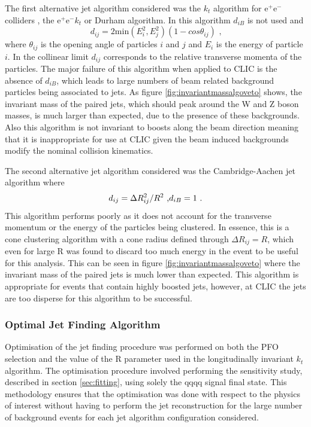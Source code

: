 The first alternative jet algorithm considered was the $k_{t}$ algorithm for $\text{e}^{+}\text{e}^{-}$ colliders \cite{Catani:1991hj}, the $\text{e}^{+}\text{e}^{-}k_{t}$  or Durham algorithm.  In this algorithm $d_{iB}$ is not used and 
%
\begin{equation}
d_{ij} = 2\text{min}(E_{i}^{2}, E_{j}^{2})(1-cos\theta_{ij}) \text{ ,}
\end{equation}
%
\noindent where $\theta_{ij}$ is the opening angle of particles $i$ and $j$ and $E_{i}$ is the energy of particle $i$.  In the collinear limit $d_{ij}$ corresponds to the relative transverse momenta of the particles.  The major failure of this algorithm when applied to CLIC is the absence of $d_{iB}$, which leads to large numbers of beam related background particles being associated to jets.  As figure \ref{fig:invariantmassalgoveto} shows, the invariant mass of the paired jets, which should peak around the W and Z boson masses, is much larger than expected, due to the presence of these backgrounds.  Also this algorithm is not invariant to boosts along the beam direction meaning that it is inappropriate for use at CLIC given the beam induced backgrounds modify the nominal collision kinematics.  

The second alternative jet algorithm considered was the Cambridge-Aachen jet algorithm \cite{Dokshitzer:1997in} where 
%
\begin{equation}
d_{ij} = {\Delta}R_{ij}^{2}/R^2 \text{ ,} \\
d_{iB} = 1 \text{ .}
\end{equation}
%
\noindent This algorithm performs poorly as it does not account for the transverse momentum or the energy of the particles being clustered. In essence, this is a cone clustering algorithm with a cone radius defined through ${\Delta}R_{ij} = R$, which even for large R was found to discard too much energy in the event to be useful for this analysis.  This can be seen in figure \ref{fig:invariantmassalgoveto} where the invariant mass of the paired jets is much lower than expected.  This algorithm is appropriate for events that contain highly boosted jets, however, at CLIC the jets are too disperse for this algorithm to be successful.


\subsubsection{Optimal Jet Finding Algorithm}
\label{sec:optimaljetalgorithm}
Optimisation of the jet finding procedure was performed on both the PFO selection and the value of the R parameter used in the longitudinally invariant $k_{t}$ algorithm.  The optimisation procedure involved performing the sensitivity study, described in section \ref{sec:fitting}, using solely the {\nu}{\nu}qqqq signal final state.  This methodology ensures that the optimisation was done with respect to the physics of interest without having to perform the jet reconstruction for the large number of background events for each jet algorithm configuration considered. 

